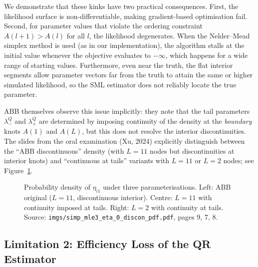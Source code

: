\documentclass[12pt]{article}
\begin{document}
We demonstrate that these kinks have two practical consequences.
First, the likelihood surface is non-differentiable, making gradient-based
optimisation fail.
Second, for parameter values that violate the ordering constraint
$A(l+1)>A(l)$ for all $l$, the likelihood degenerates.
When the Nelder--Mead simplex method is used (as in our implementation),
the algorithm stalls at the initial value whenever the objective evaluates
to $-\infty$, which happens for a wide range of starting values.
Furthermore, even near the truth, the flat interior segments allow parameter
vectors far from the truth to attain the same or higher simulated likelihood,
so the SML estimator does not reliably locate the true parameter.

ABB themselves observe this issue implicitly: they note that the tail
parameters $\lambda_-^Q$ and $\lambda_+^Q$ are determined by imposing
continuity of the density at the \emph{boundary} knots $A(1)$ and $A(L)$,
but this does not resolve the interior discontinuities.
The slides from the oral examination (Xu, 2024) explicitly distinguish between
the ``ABB discontinuous'' density (with $L=11$ nodes but discontinuities at
interior knots) and ``continuous at tails'' variants with $L=11$ or $L=2$
nodes; see Figure~\ref{fig:disc_density}.

\begin{figure}[H]
\centering
\caption{Probability density of $\eta_{i1}$ under three parameterisations.
Left: ABB original ($L=11$, discontinuous interior).
Centre: $L=11$ with continuity imposed at tails.
Right: $L=2$ with continuity at tails.
Source: \texttt{imgs/simp\_mle3\_eta\_0\_discon\_pdf.pdf}, pages 9, 7, 8.}
\label{fig:disc_density}
\end{figure}

\subsection*{Limitation 2: Efficiency Loss of the QR Estimator}
\end{document}
